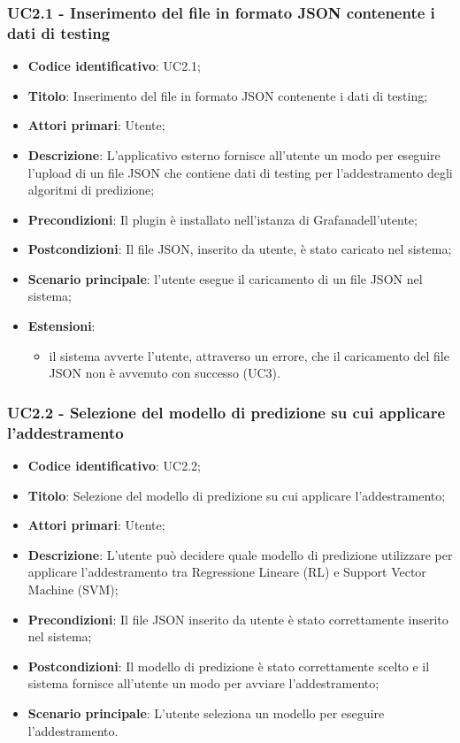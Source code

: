 \subsubsection{UC2.1 - Inserimento del file in formato JSON contenente i dati di testing}
\begin{itemize}
    \item \textbf{Codice identificativo}: UC2.1;
    \item \textbf{Titolo}: Inserimento del file in formato JSON contenente i dati di testing;
    \item \textbf{Attori primari}: Utente;
    \item \textbf{Descrizione}: L'applicativo esterno fornisce all'utente un modo per eseguire l'upload di un file JSON che contiene dati di testing per l'addestramento degli algoritmi di predizione;
    \item \textbf{Precondizioni}: Il plugin è installato nell'istanza di Grafana\glosp dell'utente;
    \item \textbf{Postcondizioni}: Il file JSON, inserito da utente, è stato caricato nel sistema;
    \item \textbf{Scenario principale}: l'utente esegue il caricamento di un file JSON nel sistema;
    \item \textbf{Estensioni}:
        \begin{itemize}
            \item il sistema avverte l'utente, attraverso un errore, che il caricamento del file JSON non è avvenuto con successo (UC3).
        \end{itemize}

\end{itemize}

\subsubsection{UC2.2 - Selezione del modello di predizione su cui applicare l'addestramento}
\begin{itemize}
    \item \textbf{Codice identificativo}: UC2.2;
    \item \textbf{Titolo}: Selezione del modello di predizione su cui applicare l'addestramento;
    \item \textbf{Attori primari}: Utente;
    \item \textbf{Descrizione}: L'utente può decidere quale modello di predizione utilizzare per applicare l'addestramento tra Regressione Lineare (RL\glo) e Support Vector Machine (SVM\glo);
    \item \textbf{Precondizioni}: Il file JSON inserito da utente è stato correttamente inserito nel sistema;
    \item \textbf{Postcondizioni}: Il modello di predizione è stato correttamente scelto e il sistema fornisce all'utente un modo per avviare l'addestramento;
    \item \textbf{Scenario principale}: L'utente seleziona un modello per eseguire l'addestramento.
    
\end{itemize}


